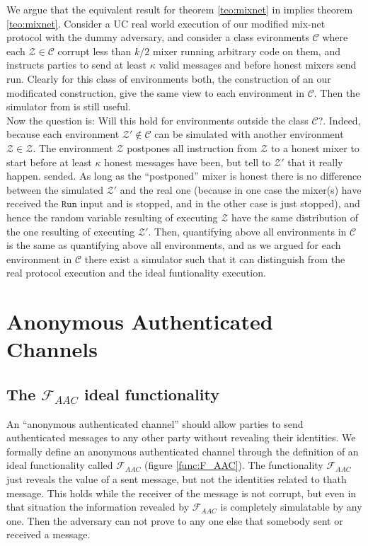 \documentclass{acm_proc_article-sp}
\begin{document}
We argue that the equivalent result for theorem \ref{teo:mixnet} in \cite{Wikstrom04a} implies
theorem \ref{teo:mixnet}. Consider a UC real world execution of our modified mix-net
protocol with the dummy adversary, and consider a class evironments $\mathcal{C}$ where each
$\mathcal{Z}\in\mathcal{C}$ corrupt less than $k/2$ mixer running arbitrary code on them, and instructs
parties to send at least $\kappa$ valid messages and before honest mixers send run. Clearly
for this class of environments both, the construction of \cite{Wikstrom04a} an our modificated
construction, give the same view to each environment in $\mathcal{C}$. Then the simulator
from \cite{Wikstrom04a} is still useful.\\
Now the question is:
Will this hold for environments outside the class $\mathcal{C}$?. Indeed, because each
environment $\mathcal{Z}'\notin\mathcal{C}$ can be simulated with another environment
$\mathcal{Z}\in\mathcal{Z}$. The environment $\mathcal{Z}$ postpones all instruction from
$\mathcal{Z}$ to a honest mixer to start before at least $\kappa$ honest messages have been,
but tell to $\mathcal{Z}'$ that it really happen. sended. As long as the ``postponed'' mixer
is honest there is no difference between the simulated $\mathcal{Z}'$ and the real one (because
in one case the mixer(s) have received the $\mathtt{Run}$ input and is stopped, and in the
other case is just stopped), and hence the random variable resulting of executing $\mathcal{Z}$
have the same distribution of the one resulting of executing $\mathcal{Z}'$. Then, quantifying
above all environments in $\mathcal{C}$ is the same as quantifying above all environments, and
as we argued for each environment in $\mathcal{C}$ there exist a simulator such that it can
distinguish from the real protocol execution and the ideal funtionality execution.


\section{Anonymous Authenticated Channels}

\subsection{The $\mathcal{F}_{AAC}$ ideal functionality}
An ``anonymous authenticated channel'' should allow parties to send authenticated messages to any other party without
revealing their identities. We formally define an anonymous authenticated channel through the definition of an ideal
functionality called $\mathcal{F}_{AAC}$ (figure \ref{func:F_AAC}). The functionality $\mathcal{F}_{AAC}$ just reveals
the value of a sent message, but not the identities related to thath message. This holds while the receiver of the
message is not corrupt, but even in that situation the information revealed by $\mathcal{F}_{AAC}$ is completely
simulatable by any one. Then the adversary can not prove to any one else that somebody sent or received a
message.\\
\end{document}
